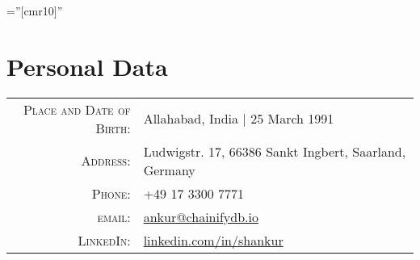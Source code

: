 \documentclass[a4paper,10pt]{article} %
\begin{document}
\pagestyle{empty} %

\font\fb=''[cmr10]'' %

\vspace{-2.5cm}
\par{\bigskip\par} %

\section{Personal Data}
\vspace*{0.2cm}
\begin{tabular}{rl}
\textsc{Place and Date of Birth:} & Allahabad, India  | 25 March 1991 \\
\textsc{Address:} & Ludwigstr. 17, 66386 Sankt Ingbert, Saarland, Germany \\
\textsc{Phone:} & +49 17 3300 7771\\
\textsc{email:} & \href{mailto:ankur@chainifydb.io}{ankur@chainifydb.io}\\
\textsc{LinkedIn:}& \href{linkedin.com/in/shankur}{linkedin.com/in/shankur}
\end{tabular}

\end{document}

